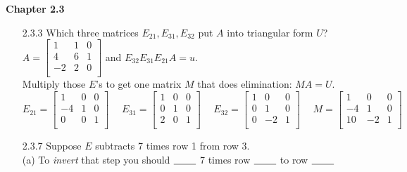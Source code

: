 \documentclass[10pt,twoside,reqno]{article}
\begin{document}
\vspace{5mm}
\textbf{Chapter 2.3}
\begin{enumerate}
\item[2.3.3]Which three matrices $E_{21} , E_{31} , E_{32}$ put $A$ into triangular form $U$? \\
\vspace{3mm}
\hspace{100pt}
$
$$
A=
\begin{bmatrix}
1&1&0\\
4&6&1\\
-2&2&0\\
\end{bmatrix}
$$
$
\hspace{10pt}
and
\hspace{10pt}
$E_{32}E_{31}E_{21}A=u$.\\
\vspace{3mm}
Multiply those $E$'s to get one matrix $M$ that does elimination: $MA=U$. \\
\vspace{3mm}
$
$$
E_{21}=
\begin{bmatrix}
1&0&0\\
-4&1&0\\
0&0&1\\
\end{bmatrix}
\hspace{15pt}
E_{31}=
\begin{bmatrix}
1&0&0\\
0&1&0\\
2&0&1\\
\end{bmatrix}
\hspace{15pt}
E_{32}=
\begin{bmatrix}
1&0&0\\
0&1&0\\
0&-2&1\\
\end{bmatrix}
\hspace{15pt}
M=
\begin{bmatrix}
1&0&0\\
-4&1&0\\
10&-2&1\\
\end{bmatrix}
$$
$
\item[2.3.7]Suppose $E$ subtracts 7 times row 1 from row 3.\\
\hspace{25pt}(a) To \textit{invert} that step you should $\underline{\hspace{8mm}}$ 7 times row $\underline{\hspace{8mm}}$ to row $\underline{\hspace{8mm}}$ \\

\end{enumerate}
\end{document}
